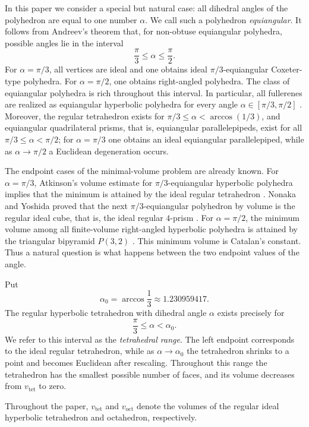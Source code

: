 \documentclass[12pt,a4paper]{article}
\theoremstyle{definition}
\newcommand{\voct}{v_{\mathrm{oct}}}
\newcommand{\vtet}{v_{\mathrm{tet}}}
\begin{document}
In this paper we consider a special but natural case: all dihedral angles of the polyhedron are equal to one number \(\alpha\). We call such a polyhedron \emph{equiangular}. It follows from Andreev's theorem that, for non-obtuse equiangular polyhedra, possible angles lie in the interval
\[
        \frac{\pi}{3}\le \alpha\le \frac{\pi}{2}.
\]
For \(\alpha=\pi/3\), all vertices are ideal and one obtains ideal \(\pi/3\)-equiangular Coxeter-type polyhedra. For \(\alpha=\pi/2\), one obtains right-angled polyhedra. The class of equiangular polyhedra is rich throughout this interval. In particular, all fullerenes are realized as equiangular hyperbolic polyhedra for every angle \(\alpha\in[\pi/3,\pi/2]\) \cite{EgorovFullerene}. Moreover, the regular tetrahedron exists for \(\pi/3\le\alpha<\arccos(1/3)\), and equiangular quadrilateral prisms, that is, equiangular parallelepipeds, exist for all \(\pi/3\le\alpha<\pi/2\); for \(\alpha=\pi/3\) one obtains an ideal equiangular parallelepiped, while as \(\alpha\to\pi/2\) a Euclidean degeneration occurs.

The endpoint cases of the minimal-volume problem are already known. For \(\alpha=\pi/3\), Atkinson's volume estimate for \(\pi/3\)-equiangular hyperbolic polyhedra implies that the minimum is attained by the ideal regular tetrahedron \cite[Theorem~2.6]{AtkinsonEquiangular}. Nonaka and Yoshida proved that the next \(\pi/3\)-equiangular polyhedron by volume is the regular ideal cube, that is, the ideal regular \(4\)-prism \cite[Theorem~3]{Nonaka2024}. For \(\alpha=\pi/2\), the minimum volume among all finite-volume right-angled hyperbolic polyhedra is attained by the triangular bipyramid \(P(3,2)\) \cite{EgorovP32}. This minimum volume is Catalan's constant. Thus a natural question is what happens between the two endpoint values of the angle.

Put
\[
        \alpha_0=\arccos\frac13\approx1.230959417 .
\]
The regular hyperbolic tetrahedron with dihedral angle \(\alpha\) exists precisely for
\[
        \frac{\pi}{3}\le\alpha<\alpha_0 .
\]
We refer to this interval as the \emph{tetrahedral range}. The left endpoint corresponds to the ideal regular tetrahedron, while as \(\alpha\to\alpha_0\) the tetrahedron shrinks to a point and becomes Euclidean after rescaling. Throughout this range the tetrahedron has the smallest possible number of faces, and its volume decreases from \(\vtet\) to zero.

Throughout the paper, \(\vtet\) and \(\voct\) denote the volumes of the
regular ideal hyperbolic tetrahedron and octahedron, respectively.
\end{document}
